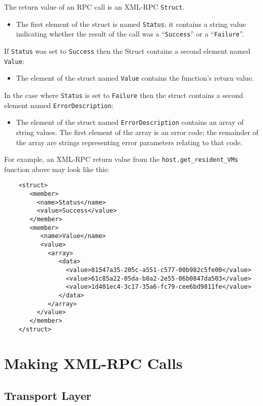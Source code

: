 The return value of an RPC call is an XML-RPC {\tt Struct}.

\begin{itemize}
\item The first element of the struct is named {\tt Status}; it
contains a string value indicating whether the result of the call was
a ``{\tt Success}'' or a ``{\tt Failure}''.
\end{itemize}

If {\tt Status} was set to {\tt Success} then the Struct contains a second
element named {\tt Value}:
\begin{itemize}
\item The element of the struct named {\tt Value} contains the function's return value.
\end{itemize}

In the case where {\tt Status} is set to {\tt Failure} then
the struct contains a second element named {\tt ErrorDescription}:
\begin{itemize}
\item The element of the struct named {\tt ErrorDescription} contains
an array of string values. The first element of the array is an error code;
the remainder of the array are strings representing error parameters relating
to that code.
\end{itemize}

For example, an XML-RPC return value from the {\tt host.get\_resident\_VMs}
function above
may look like this:
\begin{verbatim}
    <struct>
       <member>
         <name>Status</name>
         <value>Success</value>
       </member>
       <member>
          <name>Value</name>
          <value>
            <array>
               <data>
                 <value>81547a35-205c-a551-c577-00b982c5fe00</value>
                 <value>61c85a22-05da-b8a2-2e55-06b0847da503</value>
                 <value>1d401ec4-3c17-35a6-fc79-cee6bd9811fe</value>
               </data>
            </array>
         </value>
       </member>
    </struct>
\end{verbatim}

\section{Making XML-RPC Calls}

\subsection{Transport Layer}

